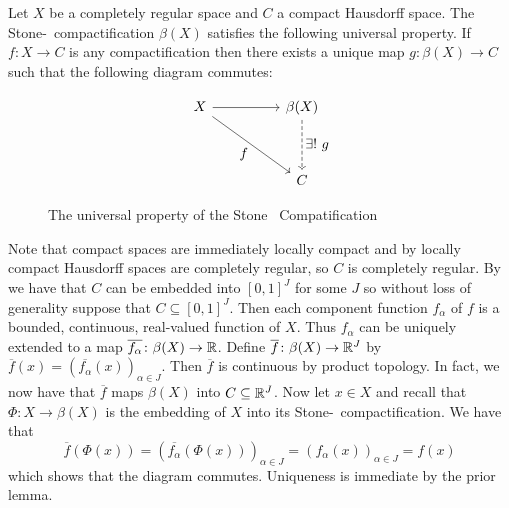 \documentclass[letterpaper, 11pt, oneside]{book}
\begin{document}
\begin{prop}
  Let $X$ be a completely regular space and $C$ a compact Hausdorff space.
  The Stone-\Cech\ compactification $\beta(X)$ satisfies the following universal property.
  If $f\colon X \to C$ is any compactification then there exists a unique map $g\colon\beta(X) \to C$ such that the following diagram commutes:
  \begin{figure}[h]
    \centering
    \[
      \begin{tikzcd}[every label/.append style={font=\normalsize}]
        X && {\beta(X)} \\
        \\
        && C
        \arrow[from=1-1, to=1-3]
        \arrow["{\exists!~g}", dashed, from=1-3, to=3-3]
        \arrow["f"', from=1-1, to=3-3]
      \end{tikzcd}
    \]
    \caption{The universal property of the Stone \Cech\ Compatification}\label{fig:stone-cech-univ}
  \end{figure}
\end{prop}
\begin{pf}
  Note that compact spaces are immediately locally compact and by  locally compact Hausdorff spaces are completely regular, so $C$ is completely regular.
  By  we have that $C$ can be embedded into $[0, 1]^{J}$ for some $J$ so without loss of generality suppose that $C \subseteq [0, 1]^{J}$.
  Then each component function $f_{\alpha}$ of $f$ is a bounded, continuous, real-valued function of $X$.
  Thus $f_{\alpha}$ can be uniquely extended to a map $\overline{f_{\alpha}}\colon \beta(X) \to \mathbb{R}$.
  Define $\overline{f}\colon \beta(X) \to \mathbb{R}^{J}$ by $\overline{f}(x) = (\overline{f_{\alpha}}(x))_{\alpha \in J}$.
  Then $\overline{f}$ is continuous by product topology.
  In fact, we now have that $\overline{f}$ maps $\beta(X)$ into $C \subseteq \mathbb{R}^{J}$.
  Now let $x \in X$ and recall that $\Phi\colon X \to \beta(X)$ is the embedding of $X$ into its Stone-\Cech\ compactification.
  We have that
  \[
    \overline{f}(\Phi(x)) = (\overline{f_{\alpha}}(\Phi(x)))_{\alpha \in J} = (f_{\alpha}(x))_{\alpha \in J} = f(x)
  \]
  which shows that the diagram  commutes.
  Uniqueness is immediate by the prior lemma.
\end{pf}
\end{document}
